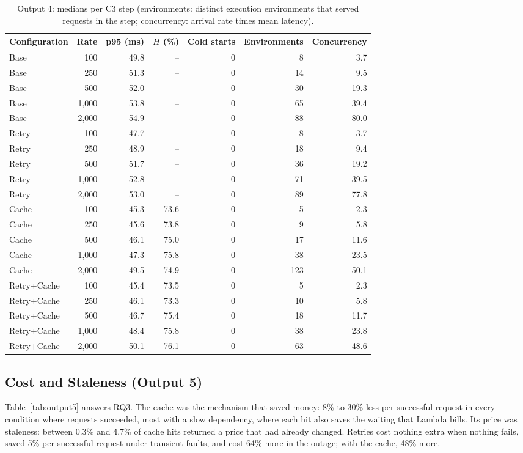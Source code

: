 \documentclass[10pt]{article}
\begin{document}
\begin{table}[htbp]
\centering
\footnotesize
\begin{tabular}{@{}lrrrrrr@{}}
\toprule
\textbf{Configuration} & \textbf{Rate} & \textbf{p95 (ms)} & $H$ (\%) & \textbf{Cold starts} & \textbf{Environments} & \textbf{Concurrency} \\
\midrule
Base & 100 & 49.8 & -- & 0 & 8 & 3.7 \\
Base & 250 & 51.3 & -- & 0 & 14 & 9.5 \\
Base & 500 & 52.0 & -- & 0 & 30 & 19.3 \\
Base & 1,000 & 53.8 & -- & 0 & 65 & 39.4 \\
Base & 2,000 & 54.9 & -- & 0 & 88 & 80.0 \\
\midrule
Retry & 100 & 47.7 & -- & 0 & 8 & 3.7 \\
Retry & 250 & 48.9 & -- & 0 & 18 & 9.4 \\
Retry & 500 & 51.7 & -- & 0 & 36 & 19.2 \\
Retry & 1,000 & 52.8 & -- & 0 & 71 & 39.5 \\
Retry & 2,000 & 53.0 & -- & 0 & 89 & 77.8 \\
\midrule
Cache & 100 & 45.3 & 73.6 & 0 & 5 & 2.3 \\
Cache & 250 & 45.6 & 73.8 & 0 & 9 & 5.8 \\
Cache & 500 & 46.1 & 75.0 & 0 & 17 & 11.6 \\
Cache & 1,000 & 47.3 & 75.8 & 0 & 38 & 23.5 \\
Cache & 2,000 & 49.5 & 74.9 & 0 & 123 & 50.1 \\
\midrule
Retry+Cache & 100 & 45.4 & 73.5 & 0 & 5 & 2.3 \\
Retry+Cache & 250 & 46.1 & 73.3 & 0 & 10 & 5.8 \\
Retry+Cache & 500 & 46.7 & 75.4 & 0 & 18 & 11.7 \\
Retry+Cache & 1,000 & 48.4 & 75.8 & 0 & 38 & 23.8 \\
Retry+Cache & 2,000 & 50.1 & 76.1 & 0 & 63 & 48.6 \\
\bottomrule
\end{tabular}
\caption{Output 4: medians per C3 step (environments: distinct execution
environments that served requests in the step; concurrency: arrival rate times
mean latency).}
\label{tab:output4}
\end{table}

\subsection{Cost and Staleness (Output 5)}
Table~\ref{tab:output5} answers RQ3. The cache was the mechanism that saved
money: 8\% to 30\% less per successful request in every condition where requests
succeeded, most with a slow dependency, where each hit also saves the waiting
that Lambda bills. Its price was staleness: between 0.3\% and 4.7\% of cache
hits returned a price that had already changed. Retries cost nothing extra when
nothing fails, saved 5\% per successful request under transient faults, and cost
64\% more in the outage; with the cache, 48\% more.
\end{document}
